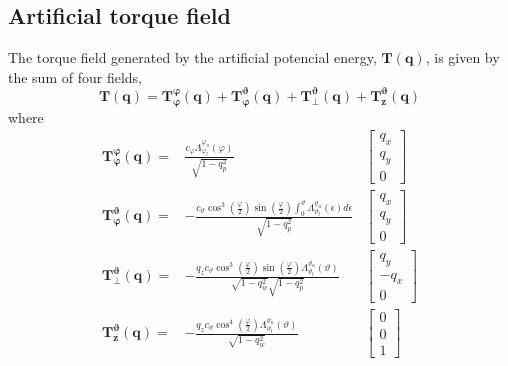 \documentclass{article}
\begin{document}
		\subsection{Artificial torque field}
			The torque field generated by the artificial potencial energy, $\mathbf{T(q)}$, is given by the sum of four fields, 
			\begin{equation}
				\mathbf{T(q)} = \mathbf{T_\varphi^\varphi(q)} + \mathbf{T_\varphi^\vartheta(q)} + \mathbf{T_\perp^\vartheta(q)} + \mathbf{T_z^\vartheta(q)}
				\label{torques}
			\end{equation}
			where
			\begin{eqnarray*}
				\mathbf{T_\varphi^\varphi(q)}  =& \displaystyle \frac{\displaystyle c_\varphi \Lambda_{\varphi_l}^{\varphi_u}(\varphi)}{\displaystyle\sqrt{1-q_p^2}} &\begin{bmatrix}
																		q_x\\
																		q_y\\
																		0
																	    \end{bmatrix}\\
				\mathbf{T_\varphi^\vartheta(q)}  =& -\displaystyle \frac{\displaystyle c_\vartheta \cos^3\left (\frac{\varphi}{2} \right)\sin \left(\frac{\varphi}{2} \right) \displaystyle \int_0^\vartheta{\Lambda_{\vartheta_l}^{\vartheta_u}(\epsilon)} d\epsilon }{\displaystyle\sqrt{1-q_p^2}} &\begin{bmatrix}
										q_x\\
										q_y\\
										0
									    \end{bmatrix}\\
				\mathbf{T_\perp^\vartheta(q)}  =& -\displaystyle \frac{\displaystyle q_z c_\vartheta \cos^3 \left(\frac{\varphi}{2} \right)\sin \left(\frac{\varphi}{2}\right) \Lambda_{\vartheta_l}^{\vartheta_u}(\vartheta)}{\displaystyle\sqrt{\displaystyle 1-q_w^2} \sqrt{\displaystyle 1-q_p^2}} &\begin{bmatrix}
										q_y\\
										-q_x\\
										0
									    \end{bmatrix}\\
				\mathbf{T_z^\vartheta(q)}  =& -\displaystyle \frac{\displaystyle q_z c_\vartheta \cos^4 \left(\frac{\varphi}{2} \right) \Lambda_{\vartheta_l}^{\vartheta_u}(\vartheta)}{\displaystyle \sqrt{\displaystyle 1-q_w^2} } &\begin{bmatrix}
											 0\\
											 0\\
											 1
										       \end{bmatrix}
			\end{eqnarray*}
\end{document}
